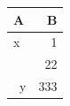 \begin{tabular}{lr}
\toprule
 A  & B\\
\midrule
x & 1\\
 & 22\\
 y & 333\\
\bottomrule
\end{tabular}
